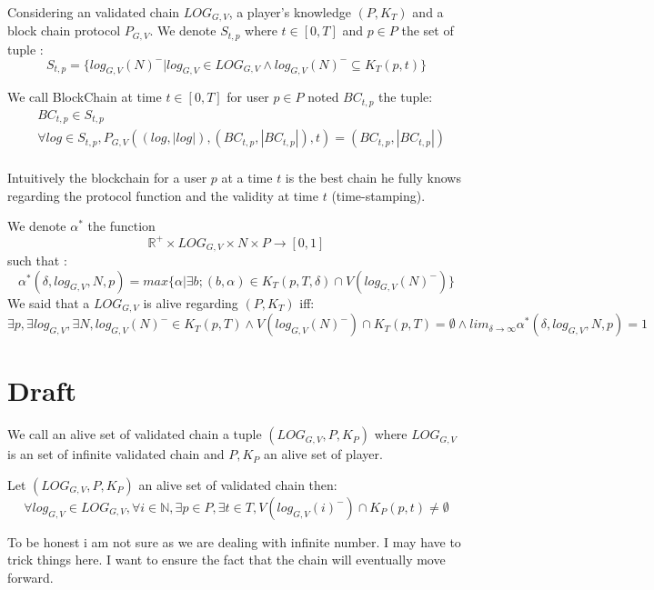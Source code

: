 \begin{mydef}
	Considering an validated chain $LOG_{G,V}$, a player's knowledge $(P,K_T)$ and a block chain protocol $P_{G,V}$. We denote $S_{t,p}$ where $t\in [0,T]$ and $p\in P$ the set of tuple :
	$$ S_{t,p} = \{log_{G,V}(N)^- | log_{G,V} \in LOG_{G,V} \land log_{G,V}(N)^- \subseteq K_T(p,t)\} $$
	
	We call BlockChain at time $t\in [0,T]$ for user $p \in P$ noted $BC_{t,p}$ the tuple:
	\begin{align*}
	&BC_{t,p} \in S_{t,p} \\
	& \forall log \in S_{t,p}, P_{G,V}((log,|log|),(BC_{t,p},|BC_{t,p}|),t) = (BC_{t,p},|BC_{t,p}|) \\
	\end{align*}
	
\end{mydef}
\begin{myrem}
	Intuitively the blockchain for a user $p$ at a time $t$ is the best chain he fully knows regarding the protocol function and the validity at time $t$ (time-stamping).
\end{myrem}

\begin{mydef}
	We denote $\alpha^*$ the function $$ \mathbb{R}^+ \times LOG_{G,V} \times N \times P \rightarrow [0,1]$$ such that : 
	$$\alpha^*(\delta,log_{G,V},N,p) = max\{\alpha | \exists b; (b,\alpha) \in K_T(p,T,\delta)\cap V(log_{G,V}(N)^-)\} $$
	We said that a $LOG_{G,V}$ is alive regarding $(P,K_T)$ iff:
	$$\exists p, \exists log_{G,V}, \exists N, log_{G,V}(N)^- \in K_T(p,T) \land V(log_{G,V}(N)^-) \cap K_T(p,T) = \emptyset \land lim_{\delta\rightarrow \infty} \alpha^*(\delta,log_{G,V},N,p) = 1$$
\end{mydef}


\section{Draft}

\begin{mydef}
	We call an alive set of validated chain a tuple $(LOG_{G,V},P,K_P)$ where $LOG_{G,V}$ is an set of infinite validated chain and $P,K_P$ an alive set of player.
\end{mydef}

\begin{myprop*}
	Let $(LOG_{G,V},P,K_P)$ an alive set of validated chain then:
	$$\forall log_{G,V} \in LOG_{G,V}, \forall i \in \mathbb{N}, \exists p \in P, \exists t \in T , V(log_{G,V}(i)^-) \cap K_P(p,t) \neq \emptyset $$
\end{myprop*}
\begin{myrem}
	To be honest i am not sure as we are dealing with infinite number. I may have to trick things here. I want to ensure the fact that the chain will eventually move forward.
\end{myrem}
